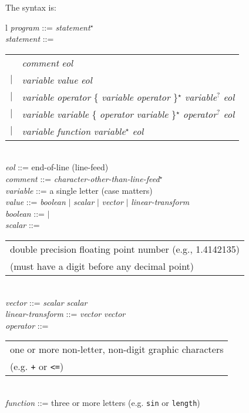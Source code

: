 \documentclass[12pt]{article}
\begin{document}
The syntax is:
\\[1ex]
\hspace*{0.2in}\begin{tabular}{l}
{\em program} ::= {\em statement}$^\star$ \\
{\em statement} ::= \\
\hspace*{0.2in}\begin{tabular}[t]{cl}
                    & {\em comment} {\em eol} \\
                $|$ & {\em variable} \TT{=} {\em value} {\em eol}\\
                $|$ & {\em variable} \TT{=} {\em operator}
		          \{ {\em variable} {\em operator} \}$^\star$
		          {\em variable}$^?$ {\em eol} \\
                $|$ & {\em variable} \TT{=} {\em variable}
		          \{ {\em operator} {\em variable} \}$^\star$
		          {\em operator}$^?$ {\em eol} \\
                $|$ & {\em variable} \TT{=} {\em function}
		          {\em variable}$^\star$ {\em eol} \\
		\end{tabular}
\\[1ex]
{\em eol} ::= end-of-line (line-feed) \\
{\em comment} ::= \TT{\#} {\em character-other-than-line-feed}$^\star$ \\
{\em variable} ::= a single letter (case matters) \\
{\em value} ::= {\em boolean} $|$ {\em scalar} $|$ {\em vector}
	    $|$ {\em linear-transform} \\
{\em boolean} ::=  $|$  \\
{\em scalar} ::= \begin{tabular}[t]{@{}l}
                 double precision floating point number (e.g., 1.4142135) \\
		 (must have a digit before any decimal point) \\
		 \end{tabular} \\
{\em vector} ::= \TT{(} {\em scalar}\TT{,} {\em scalar} \TT{)} \\
{\em linear-transform} ::= \TT{(} {\em vector}\TT{,} {\em vector} \TT{)} \\
{\em operator} ::= \begin{tabular}[t]{@{}l}
                   one or more non-letter, non-digit graphic characters \\
                   (e.g. {\tt +} or {\tt <=})\\
		   \end{tabular} \\
{\em function} ::= three or more letters (e.g. {\tt sin} or {\tt length}) \\
\end{tabular}
\end{document}
